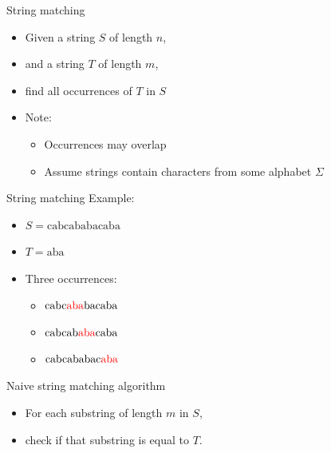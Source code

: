 \documentclass{beamer}
\begin{document}
\begin{frame}[plain]{String matching}
	\begin{itemize}
		\item Given a string $S$ of length $n$,
		\item and a string $T$ of length $m$,
		\item find all occurrences of $T$ in $S$
    \end{itemize}
    \begin{itemize}
		\item Note:
        \begin{itemize}
            \item Occurrences may overlap
            \item Assume strings contain characters from some alphabet $\Sigma$
        \end{itemize}
	\end{itemize}
\end{frame}

\begin{frame}[plain]{String matching}
	Example:
	\begin{itemize}
		\item $S = \mathrm{cabcababacaba}$
		\item $T = \mathrm{aba}$
	\end{itemize}
    \begin{itemize}
        \item<2-> Three occurrences:
            \begin{itemize}
                \item<3-> $\mathrm{cabc{\color{red}{aba}}bacaba}$
                \item<4-> $\mathrm{cabcab{\color{red}{aba}}caba}$
                \item<5-> $\mathrm{cabcababac{\color{red}{aba}}}$
            \end{itemize}
    \end{itemize}
\end{frame}

\begin{frame}[plain]{Naive string matching algorithm}
	\begin{itemize}
	\item For each substring of length $m$ in $S$,
	\item check if that substring is equal to $T$.
	\end{itemize}
		
\end{frame}
\end{document}
